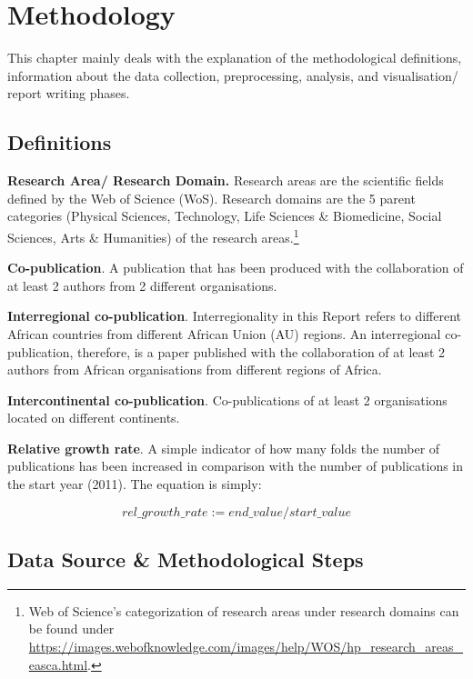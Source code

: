 \documentclass[
]{book}
\begin{document}
\hypertarget{method}{%
\chapter{Methodology}\label{method}}

This chapter mainly deals with the explanation of the methodological definitions, information about the data collection, preprocessing, analysis, and visualisation/ report writing phases.

\hypertarget{definitions}{%
\section{Definitions}\label{definitions}}

\textbf{Research Area/ Research Domain.} Research areas are the scientific fields defined by the Web of Science (WoS). Research domains are the 5 parent categories (Physical Sciences, Technology, Life Sciences \& Biomedicine, Social Sciences, Arts \& Humanities) of the research areas.\footnote{Web of Science's categorization of research areas under research domains can be found under \url{https://images.webofknowledge.com/images/help/WOS/hp_research_areas_easca.html}.}

\textbf{Co-publication}. A publication that has been produced with the collaboration of at least 2 authors from 2 different organisations.

\textbf{Interregional co-publication}. Interregionality in this Report refers to different African countries from different African Union (AU) regions. An interregional co-publication, therefore, is a paper published with the collaboration of at least 2 authors from African organisations from different regions of Africa.

\textbf{Intercontinental co-publication}. Co-publications of at least 2 organisations located on different continents.

\textbf{Relative growth rate}. A simple indicator of how many folds the number of publications has been increased in comparison with the number of publications in the start year (2011). The equation is simply:

\[
rel\_growth\_rate := end\_value/start\_value
\]

\hypertarget{data-source-methodological-steps}{%
\section{Data Source \& Methodological Steps}\label{data-source-methodological-steps}}
\end{document}
